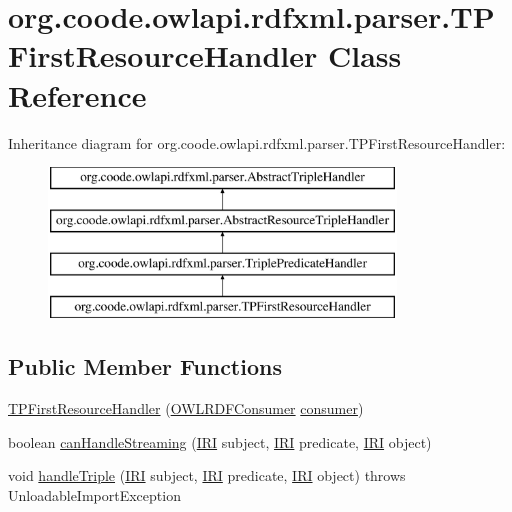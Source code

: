 \hypertarget{classorg_1_1coode_1_1owlapi_1_1rdfxml_1_1parser_1_1_t_p_first_resource_handler}{\section{org.\-coode.\-owlapi.\-rdfxml.\-parser.\-T\-P\-First\-Resource\-Handler Class Reference}
\label{classorg_1_1coode_1_1owlapi_1_1rdfxml_1_1parser_1_1_t_p_first_resource_handler}
}
Inheritance diagram for org.\-coode.\-owlapi.\-rdfxml.\-parser.\-T\-P\-First\-Resource\-Handler\-:\begin{figure}[H]
\begin{center}
\leavevmode
\includegraphics[height=4.000000cm]{classorg_1_1coode_1_1owlapi_1_1rdfxml_1_1parser_1_1_t_p_first_resource_handler}
\end{center}
\end{figure}
\subsection*{Public Member Functions}
\begin{DoxyCompactItemize}
\item 
\hyperlink{classorg_1_1coode_1_1owlapi_1_1rdfxml_1_1parser_1_1_t_p_first_resource_handler_a4799203c923807f0d5d5a3e361dfca03}{T\-P\-First\-Resource\-Handler} (\hyperlink{classorg_1_1coode_1_1owlapi_1_1rdfxml_1_1parser_1_1_o_w_l_r_d_f_consumer}{O\-W\-L\-R\-D\-F\-Consumer} \hyperlink{classorg_1_1coode_1_1owlapi_1_1rdfxml_1_1parser_1_1_abstract_triple_handler_a4ccf4d898ff01eb1cadfa04b23d54e9c}{consumer})
\item 
boolean \hyperlink{classorg_1_1coode_1_1owlapi_1_1rdfxml_1_1parser_1_1_t_p_first_resource_handler_adfcc0ddceff7bfe6598b1acecf010d4a}{can\-Handle\-Streaming} (\hyperlink{classorg_1_1semanticweb_1_1owlapi_1_1model_1_1_i_r_i}{I\-R\-I} subject, \hyperlink{classorg_1_1semanticweb_1_1owlapi_1_1model_1_1_i_r_i}{I\-R\-I} predicate, \hyperlink{classorg_1_1semanticweb_1_1owlapi_1_1model_1_1_i_r_i}{I\-R\-I} object)
\item 
void \hyperlink{classorg_1_1coode_1_1owlapi_1_1rdfxml_1_1parser_1_1_t_p_first_resource_handler_a854c888808a7f803891b416d5d1d52ca}{handle\-Triple} (\hyperlink{classorg_1_1semanticweb_1_1owlapi_1_1model_1_1_i_r_i}{I\-R\-I} subject, \hyperlink{classorg_1_1semanticweb_1_1owlapi_1_1model_1_1_i_r_i}{I\-R\-I} predicate, \hyperlink{classorg_1_1semanticweb_1_1owlapi_1_1model_1_1_i_r_i}{I\-R\-I} object)  throws Unloadable\-Import\-Exception 
\end{DoxyCompactItemize}
